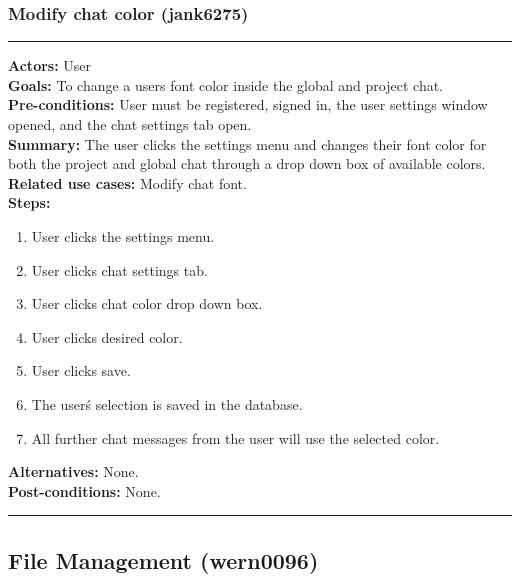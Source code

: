 \documentclass[11pt]{report}
\begin{document}
\subsubsection{Modify chat color (jank6275)}
\vspace{2pt}
\hrule
\vspace{8pt}
 \textbf{Actors:} User \\ 
 \textbf{Goals:} To change a users font color inside the global and project chat. \\
 \textbf{Pre-conditions:} User must be registered, signed in, the user settings window opened, and the chat settings tab open.  \\
 \textbf{Summary:} The user clicks the settings menu and changes their font color for both the project and global chat through a drop down box of available colors. \\ 
 \textbf{Related use cases:} Modify chat font. \\ 
 \textbf{Steps:} \begin{enumerate}
  \item User clicks the settings menu.
  \item User clicks chat settings tab.
  \item User clicks chat color drop down box.
  \item User clicks desired color.
  \item User clicks save.
  \item The user\'s selection is saved in the database.
  \item All further chat messages from the user will use the selected color.
 \end{enumerate}
 \textbf{Alternatives:} None. \\
 \textbf{Post-conditions:} None. \\
 \vspace{8pt}
\hrule



\newpage

\subsection{File Management (wern0096)}
\end{document}
